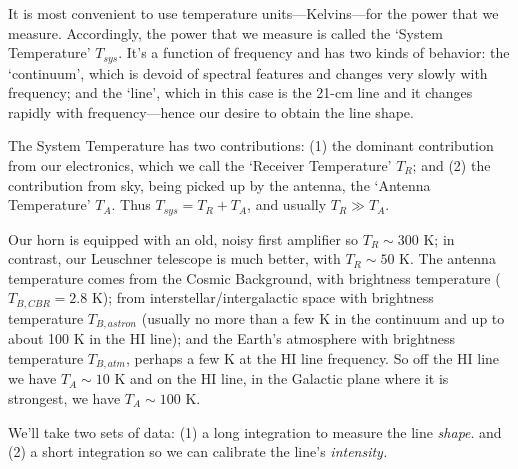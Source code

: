 \documentclass[12pt,preprint]{aastex}
\begin{document}
It is most convenient to use temperature units---Kelvins---for the power
that we measure. Accordingly, the power that we measure is called the
`System Temperature' $T_{sys}$. It's a function of frequency and has two
kinds of behavior: the `continuum', which is devoid of spectral features
and changes very slowly with frequency; and the `line', which in this
case is the 21-cm line and it changes rapidly with frequency---hence our
desire to obtain the line shape.

The System Temperature has two contributions: (1) the dominant contribution
  from our electronics, which we call the `Receiver Temperature' $T_R$;
  and (2) the contribution from sky, being picked up by the antenna, the
  `Antenna Temperature' $T_A$. Thus $T_{sys}=T_R + T_A$, and usually
  $T_R \gg T_A$. 

Our horn is equipped with an old, noisy first amplifier so $T_R \sim
300$ K; in contrast, our Leuschner telescope is much better, with $T_R
\sim 50$ K. The antenna temperature comes from the Cosmic Background,
with brightness temperature ($T_{B,CBR} = 2.8$ K); from
interstellar/intergalactic space with brightness temperature
$T_{B,astron}$ (usually no more than a few K in the continuum and up to
about 100 K in the HI line); and the Earth's atmosphere with brightness
temperature $T_{B,atm}$, perhaps a few K at the HI line frequency. So
off the HI line we have $T_A \sim 10$ K and on the HI line, in the
Galactic plane where it is strongest, we have $T_A \sim 100$ K.

We'll take two sets of data: (1) a long integration to measure the line
{\it shape}. and (2) a short integration so we can calibrate the line's
{\it intensity.}
\end{document}
